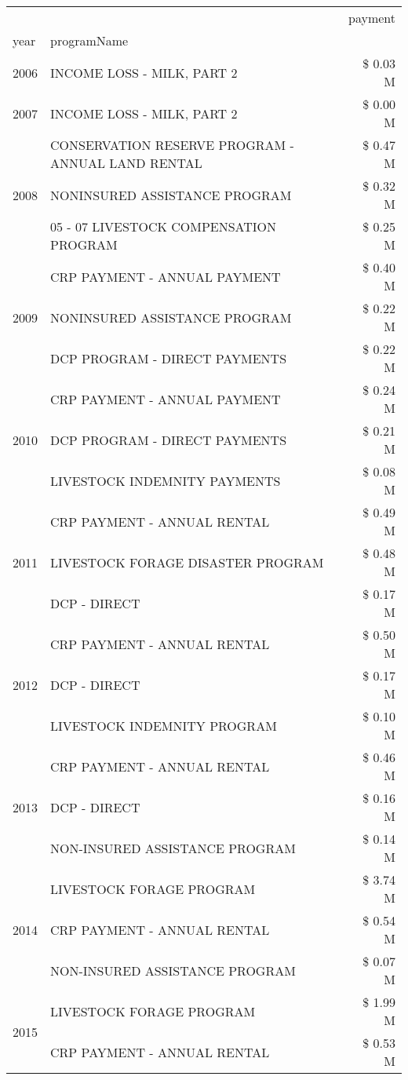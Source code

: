 \begin{tabular}{llr}
\toprule
 &  & payment \\
year & programName &  \\
\midrule
2006 & INCOME LOSS - MILK, PART 2 & \$ 0.03 M \\
\cline{1-3}
2007 & INCOME LOSS - MILK, PART 2 & \$ 0.00 M \\
\cline{1-3}
\multirow[t]{3}{*}{2008} & CONSERVATION RESERVE PROGRAM - ANNUAL LAND RENTAL & \$ 0.47 M \\
 & NONINSURED ASSISTANCE PROGRAM & \$ 0.32 M \\
 & 05 - 07 LIVESTOCK COMPENSATION PROGRAM & \$ 0.25 M \\
\cline{1-3}
\multirow[t]{3}{*}{2009} & CRP PAYMENT - ANNUAL PAYMENT & \$ 0.40 M \\
 & NONINSURED ASSISTANCE PROGRAM & \$ 0.22 M \\
 & DCP PROGRAM - DIRECT PAYMENTS & \$ 0.22 M \\
\cline{1-3}
\multirow[t]{3}{*}{2010} & CRP PAYMENT - ANNUAL PAYMENT & \$ 0.24 M \\
 & DCP PROGRAM - DIRECT PAYMENTS & \$ 0.21 M \\
 & LIVESTOCK INDEMNITY PAYMENTS & \$ 0.08 M \\
\cline{1-3}
\multirow[t]{3}{*}{2011} & CRP PAYMENT - ANNUAL RENTAL & \$ 0.49 M \\
 & LIVESTOCK FORAGE DISASTER PROGRAM & \$ 0.48 M \\
 & DCP - DIRECT & \$ 0.17 M \\
\cline{1-3}
\multirow[t]{3}{*}{2012} & CRP PAYMENT - ANNUAL RENTAL & \$ 0.50 M \\
 & DCP - DIRECT & \$ 0.17 M \\
 & LIVESTOCK INDEMNITY PROGRAM & \$ 0.10 M \\
\cline{1-3}
\multirow[t]{3}{*}{2013} & CRP PAYMENT - ANNUAL RENTAL & \$ 0.46 M \\
 & DCP - DIRECT & \$ 0.16 M \\
 & NON-INSURED ASSISTANCE PROGRAM & \$ 0.14 M \\
\cline{1-3}
\multirow[t]{3}{*}{2014} & LIVESTOCK FORAGE PROGRAM & \$ 3.74 M \\
 & CRP PAYMENT - ANNUAL RENTAL & \$ 0.54 M \\
 & NON-INSURED ASSISTANCE PROGRAM & \$ 0.07 M \\
\cline{1-3}
\multirow[t]{3}{*}{2015} & LIVESTOCK FORAGE PROGRAM & \$ 1.99 M \\
 & CRP PAYMENT - ANNUAL RENTAL & \$ 0.53 M \\

\end{tabular}
